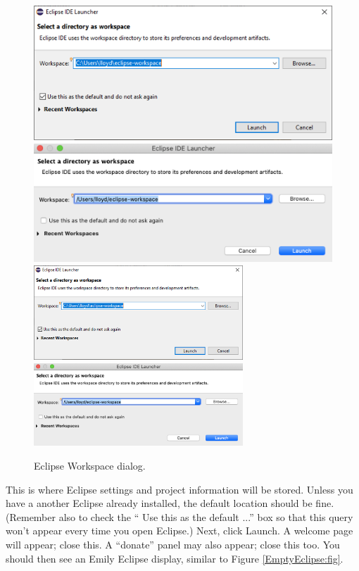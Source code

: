 \begin{figure}[ht]
\begin{center}
\iflatexml
  \ifWindows
     \includegraphics[]{images/EclipseWorkspaceDialog}
  \else
    \includegraphics[]{images/EclipseWorkspaceDialogMacOS}
  \fi
\else
  \ifWindows
     \includegraphics[width=0.7\textwidth]{images/EclipseWorkspaceDialog}
  \else
    \includegraphics[width=0.7\textwidth]{images/EclipseWorkspaceDialogMacOS}
  \fi
\fi
\end{center}
\caption{Eclipse Workspace dialog.}
\label{EclipseWorkspace:fig}
\end{figure}
%
This is where Eclipse settings and project information will be
stored. Unless you have a another Eclipse already installed, the
default location should be fine. (Remember also to check the ``{\sf
Use this as the default ...}''  box so that this query won't appear
every time you open Eclipse.) 
Next, click {\sf Launch}.  A welcome
page will appear; close this. A ``donate'' panel may also appear;
close this too.  You should then see an Emily Eclipse display, similar
to Figure \ref{EmptyEclipse:fig}.

